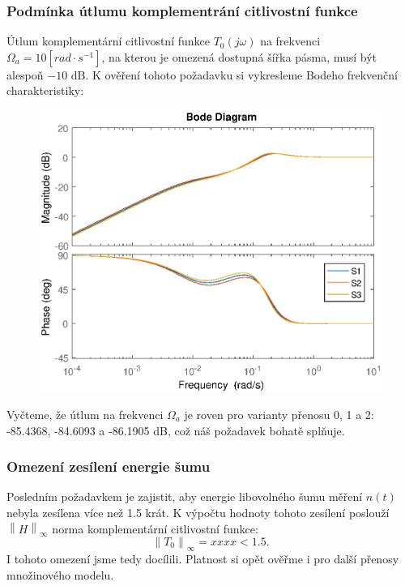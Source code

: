 \documentclass[a4paper,11pt]{article}
\begin{document}
\newpage 
\subsubsection{Podmínka útlumu komplementrání citlivostní funkce}
Útlum komplementární citlivostní funkce $ T_{0}\left ( j\omega \right ) $ na frekvenci $ \Omega _{a}=10 \left[ rad\cdot s^{-1}   \right ] $, na kterou je omezená dostupná šířka pásma, musí být alespoň $ -10 $ dB. K ověření tohoto požadavku si vykresleme Bodeho frekvenční charakteristiky:
\begin{figure}[htbp]
	\begin{center}
	\includegraphics[scale = 1.0]{obrazky/citlivostniFunkce.eps}
	\label{fig:citlivostka}
	\end{center}
\end{figure}

Vyčteme, že útlum na frekvenci $ \Omega _{a} $ je roven pro varianty přenosu 0, 1 a 2: 
-85.4368, -84.6093 a -86.1905 dB, což náš požadavek bohatě splňuje.


\subsubsection{Omezení zesílení energie šumu}
Posledním požadavkem je zajistit, aby energie libovolného šumu měření $ n\left ( t \right ) $ nebyla zesílena více než 1.5 krát. K výpočtu hodnoty tohoto zesílení poslouží $ \left \| H \right \|_{\infty } $ norma komplementární citlivostní funkce:
\begin{equation}
\left \| T_{0} \right \|_{\infty } =xxxx<1.5.
\end{equation}
I tohoto omezení jsme tedy docílili. Platnost si opět ověřme i pro další přenosy množinového modelu.
\end{document}
